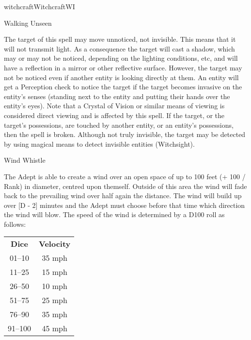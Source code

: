 \begin{college}[1.1]{witchcraft}{Witchcraft}{WI}
\begin{spell}[G-12]{Walking Unseen}

\begin{effects}
The target of this spell may move unnoticed, not invisible.  This
means that it will not transmit light.  As a consequence the target
will cast a shadow, which may or may not be noticed, depending on the
lighting conditions, etc, and will have a reflection in a mirror or
other reflective surface.  However, the target may not be noticed even
if another entity is looking directly at them.  An entity will get a
Perception check to notice the target if the target becomes invasive
on the entity's senses (\eg standing next to the entity and putting
their hands over the entity's eyes).  Note that a Crystal of Vision or
similar means of viewing is considered direct viewing and is affected
by this spell.  If the target, or the target's possessions, are
touched by another entity, or an entity's possessions, then the spell
is broken.  Although not truly invisible, the target may be detected
by using magical means to detect invisible entities (\eg Witchsight).
\end{effects}
\end{spell}

\begin{spell}[G-13]{Wind Whistle}

\begin{effects}
The Adept is able to create a wind over an open space of up to 100
feet (+ 100 / Rank) in diameter, centred upon themself.  Outside of
this area the wind will fade back to the prevailing wind over half
again the distance.  The wind will build up over [D - 2] minutes and
the Adept must choose before that time which direction the wind will
blow.  The speed of the wind is determined by a D100 roll as follows:

\begin{tabular}{cc}
\textbf{Dice}	& \textbf{Velocity} \\
01--10	& 35 mph \\
11--25	& 15 mph \\
26--50	& 10 mph \\
51--75	& 25 mph \\
76--90	& 35 mph \\
91--100	& 45 mph \\
\end{tabular}


\end{effects}
\end{spell}
\end{college}
